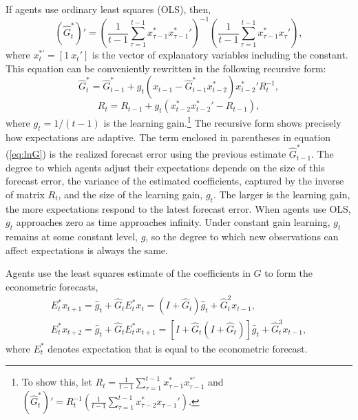 \documentclass[12pt]{article}
\newcommand{\beq}{\begin{equation}}
\newcommand{\eeq}{\end{equation}}
\newcommand{\h}[1]{\hat{#1}}
\newcommand{\ds}{\displaystyle}
\begin{document}
If agents use ordinary least squares (OLS), then,
\beq \label{eq:Gsum} \left(\hat{G}_t^*\right)' = \left( \frac{1}{t-1} \sum_{\tau=1}^{t-1} x_{\tau-1}^* {x_{\tau-1}^{*}}' \right)^{-1} \left( \frac{1}{t-1} \sum_{\tau=1}^{t-1} x_{\tau-1}^* x_{\tau}' \right), \eeq 
where $x_t^{*'} = [1~ x_t']$ is the vector of explanatory variables including the constant.  This equation can be conveniently rewritten in the following recursive form:
\beq \label{eq:lnG} \hat{G}_t^* = \hat{G}_{t-1}^* + g_t (x_{t-1} - \hat{G}_{t-1}^* x_{t-2}^*) {x_{t-2}^*}' R_t^{-1} ,\eeq
\beq \label{eq:lnR} R_t = R_{t-1} + g_t (x_{t-2}^* {x_{t-2}^*}' - R_{t-1}), \eeq
where $g_t=1/(t-1)$ is the learning gain.\footnote{To show this, let $R_t = \frac{1}{t-1} \sum_{\tau=1}^{t-1} x_{\tau-1}^* x_{\tau-1}^{*'}$ and $\left(\hat{G}_t^*\right)' = R_t^{-1} \left( \frac{1}{t-1} \sum_{\tau=1}^{t-1} x_{\tau-2}^* x_{\tau-1}' \right)$.}
The recursive form shows precisely how expectations are adaptive.  The term enclosed in parentheses in equation (\ref{eq:lnG}) is the realized forecast error using the previous estimate $\hat{G}_{t-1}^*$.  The degree to which agents adjust their expectations depends on the size of this forecast error, the variance of the estimated coefficients, captured by the inverse of matrix $R_t$, and the size of the learning gain, $g_t$.  The larger is the learning gain, the more expectations respond to the latest forecast error.  When agents use OLS, $g_t$ approaches zero as time approaches infinity.  Under constant gain learning, $g_t$ remains at some constant level, $g$, so the degree to which new observations can affect expectations is always the same.  

Agents use the least squares estimate of the coefficients in $G$ to form the econometric forecasts,
\beq \label{eq:agfore} \begin{array}{c} 
\ds E_t^* x_{t+1} = \h{g}_{t} + \h{G}_t E_t^* x_t = (I + \h{G}_t)\h{g}_{t} + \h{G}_t^2 x_{t-1}, \\ [1pc]
\ds E_t^* x_{t+2}  =\h{g}_{t} + \h{G}_t E_t^* x_{t+1} = \left[ I + \h{G}_t (I + \h{G}_t) \right] \h{g}_{t} + \h{G}_t^3 x_{t-1},
\end{array} \eeq
where $E_t^*$ denotes expectation that is equal to the econometric forecast.
\end{document}
